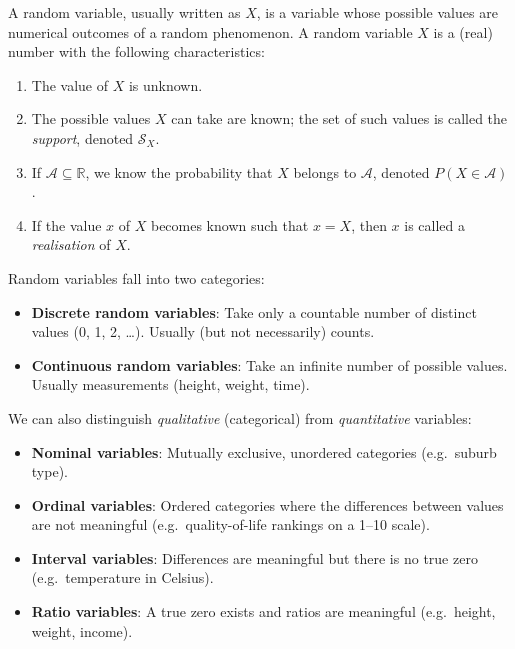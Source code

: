 A random variable, usually written as $X$, is a variable whose possible values
are numerical outcomes of a random phenomenon. A random variable $X$ is a
(real) number with the following characteristics:

\begin{enumerate}[label=\alph*)]
  \item The value of $X$ is unknown.
  \item The possible values $X$ can take are known; the set of such values is
    called the \emph{support}, denoted $\boldsymbol{\mathcal{S}}_X$.
  \item If $\boldsymbol{\mathcal{A}} \subseteq \mathbb{R}$, we know the
    probability that $X$ belongs to $\boldsymbol{\mathcal{A}}$, denoted
    $P(X \in \boldsymbol{\mathcal{A}})$.
  \item If the value $x$ of $X$ becomes known such that $x=X$, then $x$ is
    called a \emph{realisation} of $X$.
\end{enumerate}

Random variables fall into two categories:

\begin{itemize}
  \item \textbf{Discrete random variables}:
    Take only a countable number of distinct values (0, 1, 2, \ldots).
    Usually (but not necessarily) counts.
  \item \textbf{Continuous random variables}:
    Take an infinite number of possible values. Usually measurements (height,
    weight, time).
\end{itemize}

We can also distinguish \emph{qualitative} (categorical) from
\emph{quantitative} variables:

\begin{itemize}
  \item \textbf{Nominal variables}: Mutually
    exclusive, unordered categories (e.g.\ suburb type).
  \item \textbf{Ordinal variables}: Ordered
    categories where the differences between values are not meaningful (e.g.\
    quality-of-life rankings on a 1--10 scale).
  \item \textbf{Interval variables}:
    Differences are meaningful but there is no true zero (e.g.\ temperature
    in Celsius).
  \item \textbf{Ratio variables}: A true zero
    exists and ratios are meaningful (e.g.\ height, weight, income).
\end{itemize}

